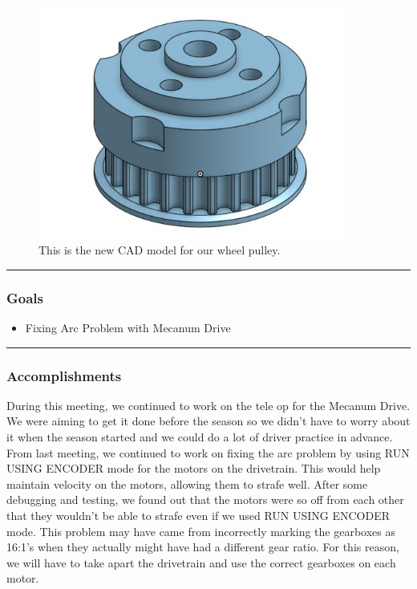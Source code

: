\begin{figure}[htp]
\centering
\includegraphics[width=0.9\textwidth, angle=0]{Meetings/September/09-16-21/9-16-21_Hardware_Image3 - Nathan Forrer.JPG}
\caption{This is the new CAD model for our wheel pulley.}
\label{fig:pic3}
\end{figure}

\noindent\hfil\rule{\textwidth}{.4pt}\hfil
\subsubsection*{Goals}
\begin{itemize}
    \item Fixing Arc Problem with Mecanum Drive

\end{itemize} 

\noindent\hfil\rule{\textwidth}{.4pt}\hfil

\subsubsection*{Accomplishments}
During this meeting, we continued to work on the tele op for the Mecanum Drive. We were aiming to get it done before the season so we didn't have to worry about it when the season started and we could do a lot of driver practice in advance. From last meeting, we continued to work on fixing the arc problem by using RUN USING ENCODER mode for the motors on the drivetrain. This would help maintain velocity on the motors, allowing them to strafe well. After some debugging and testing, we found out that the motors were so off from each other that they wouldn't be able to strafe even if we used RUN USING ENCODER mode. This problem may have came from incorrectly marking the gearboxes as 16:1's when they actually might have had a different gear ratio. For this reason, we will have to take apart the drivetrain and use the correct gearboxes on each motor.


